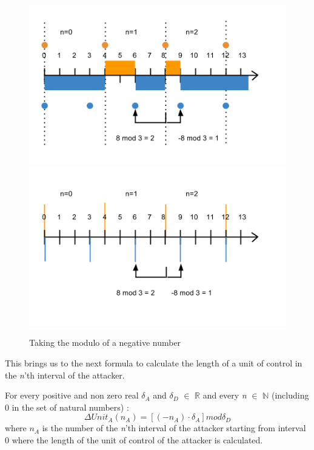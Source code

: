 \begin{figure}[hbtp]
\caption{Taking the modulo of a negative number}
\centering
\includegraphics[scale=0.4]{Images/modulotek}
\includegraphics[scale=0.4]{Images/Modulosimpel}
\label{fig:modulo}
\end{figure}


This brings us to the next formula to calculate the length of a unit of control in the \textit{n}'th interval of the attacker. 

For every positive and non zero real $\delta_{A}$ and $\delta_{D}$ $\in$ \(\mathbb{R}\) and every \textit{n} $\in$ \(\mathbb{N}\) (including 0 in the set of natural numbers) :
\begin{equation}\label{first}
\Delta Unit_{A}(n_{A}) =  [( - n_{A}  ) \cdot \delta_{A}] mod \delta_{D}
\end{equation}
where $n_{A}$ is the number of the \textit{n}'th interval of the attacker starting from interval 0 where the length of the unit of control of the attacker is calculated.\\

